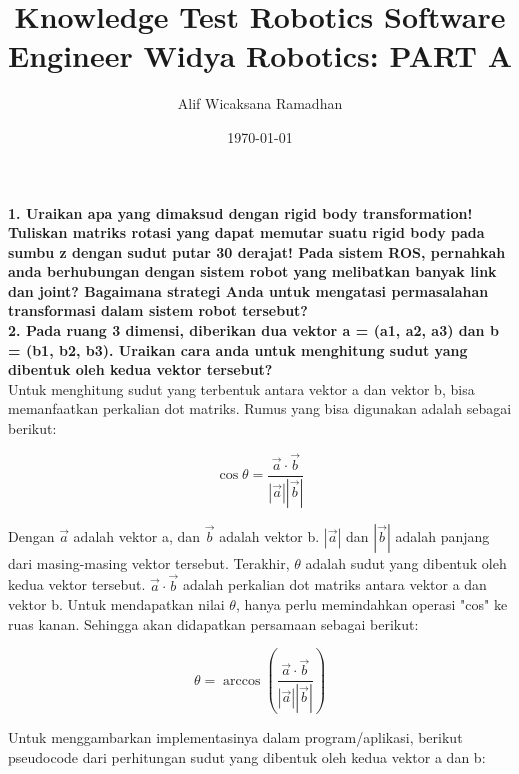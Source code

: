\documentclass[a4paper,12pt]{article}
\title{Knowledge Test Robotics Software Engineer Widya Robotics: PART A}
\author{Alif Wicaksana Ramadhan}
\date{\today}
\begin{document}
\maketitle


\textbf{1. Uraikan apa yang dimaksud dengan rigid body transformation! Tuliskan matriks rotasi yang dapat memutar suatu rigid body pada sumbu z dengan sudut putar 30 derajat! Pada sistem ROS, pernahkah anda berhubungan dengan sistem robot yang melibatkan banyak link dan joint? Bagaimana strategi Anda untuk mengatasi permasalahan transformasi dalam sistem robot tersebut?}\\



\textbf{2. Pada ruang 3 dimensi, diberikan dua vektor a = (a1, a2, a3) dan b = (b1, b2, b3). Uraikan cara anda untuk menghitung sudut yang dibentuk oleh kedua vektor tersebut?}\\

Untuk menghitung sudut yang terbentuk antara vektor a dan vektor b, bisa memanfaatkan perkalian dot matriks. Rumus yang bisa digunakan adalah sebagai berikut:

\begin{equation}
    \cos \theta = \frac{\vec{a} \cdot \vec{b}}{|\vec{a}||\vec{b}|}
\end{equation}

Dengan $\vec{a}$ adalah vektor a, dan $\vec{b}$ adalah vektor b. $|\vec{a}|$ dan $|\vec{b}|$ adalah panjang dari masing-masing vektor tersebut. Terakhir, $\theta$ adalah sudut yang dibentuk oleh kedua vektor tersebut. $\vec{a} \cdot \vec{b}$ adalah perkalian dot matriks antara vektor a dan vektor b. Untuk mendapatkan nilai $\theta$, hanya perlu memindahkan operasi "cos" ke ruas kanan. Sehingga akan didapatkan persamaan sebagai berikut:

\begin{equation}
    \theta = \arccos \left( \frac{\vec{a} \cdot \vec{b}}{|\vec{a}||\vec{b}|} \right)
\end{equation}

Untuk menggambarkan implementasinya dalam program/aplikasi, berikut pseudocode dari perhitungan sudut yang dibentuk oleh kedua vektor a dan b:
\end{document}
